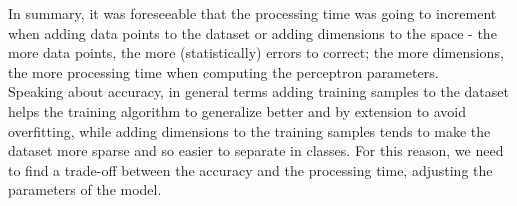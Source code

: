 \documentclass{article}
\begin{document}
\begin{enumerate}[label=(\alph*)]
In summary, it was foreseeable that the processing time was going to increment when adding data points to the dataset or adding dimensions to the space - the more data points, the more (statistically) errors to correct; the more dimensions, the more processing time when computing the perceptron parameters. \\

Speaking about accuracy, in general terms adding training samples to the dataset helps the training algorithm to generalize better and by extension to avoid overfitting, while adding dimensions to the training samples tends to make the dataset more sparse and so easier to separate in classes. For this reason, we need to find a trade-off between the accuracy and the processing time, adjusting the parameters of the model.

\end{enumerate}
\end{document}
